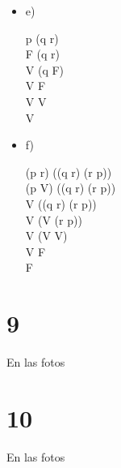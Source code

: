 \documentclass[12pt, fleqn]{article}                            %
\def \Eq {equation}                                             %
\newenvironment{MultiLineEquation*}[1]                          %
        {\begin{\Eq*}\begin{alignedat}{#1}}                         %
        {\end{alignedat}\end{\Eq*}}                                 %
\theoremstyle{break}                                            %
\begin{document}
\begin{multicols}{2}
\begin{itemize}
        \item e)
            \begin{MultiLineEquation*}{3}
                \neg p \vee \neg (q \wedge r)                \\
                \neg F \vee \neg (q \wedge r)                \\
                V \vee \neg (q \wedge F)                \\
                V \vee \neg F                \\
                V \vee V                \\
                V
            \end{MultiLineEquation*}


        \item f)
            \begin{MultiLineEquation*}{3}
                (p \vee \neg r) \wedge \neg((q \vee r) \wedge \neg(r \vee p))  \\
                (p \vee V) \wedge \neg((q \vee r) \wedge \neg(r \vee p))        \\
                V \wedge \neg((q \vee r) \wedge \neg(r \vee p))                 \\
                V \wedge \neg(V \wedge \neg(r \vee p))                          \\
                V \wedge \neg(V \vee V)                                       \\
                V \wedge F                                                      \\
                F
            \end{MultiLineEquation*}
                    

    \end{itemize}

\end{multicols}



\clearpage
\section{9}
En las fotos

\section{10}
En las fotos
\end{document}

